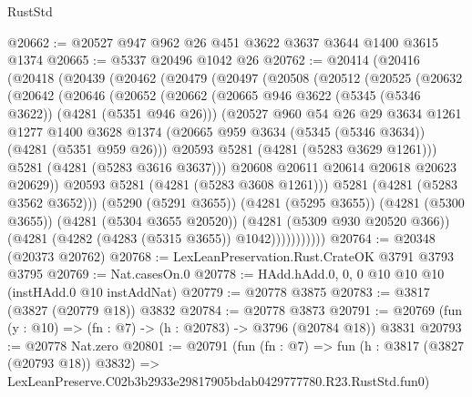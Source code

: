 \begin{lexlean}{RustStd}
\begin{coremodule}
@20662 := @20527 @947 @962 @26 @451 @3622 @3637 @3644 @1400 @3615 @1374
@20665 := @5337 @20496 @1042 @26
@20762 := @20414
    (@20416
      (@20418
        (@20439
          (@20462
            (@20479
              (@20497
                (@20508
                  (@20512
                    (@20525
                      (@20632
                        (@20642
                          (@20646
                            (@20652
                              (@20662
                                (@20665 @946 @3622 (@5345 (@5346 @3622)) (@4281 (@5351 @946 @26)))
                                (@20527
                                  @960
                                  @54
                                  @26
                                  @29
                                  @3634
                                  @1261
                                  @1277
                                  @1400
                                  @3628
                                  @1374
                                  (@20665 @959 @3634 (@5345 (@5346 @3634)) (@4281 (@5351 @959 @26)))
                                  @20593
                                  @5281
                                  (@4281 (@5283 @3629 @1261)))
                                @5281
                                (@4281 (@5283 @3616 @3637)))
                              @20608
                              @20611
                              @20614
                              @20618
                              @20623
                              @20629))
                          @20593
                          @5281
                          (@4281 (@5283 @3608 @1261)))
                        @5281
                        (@4281 (@5283 @3562 @3652)))
                      (@5290 (@5291 @3655))
                      (@4281 (@5295 @3655))
                      (@4281 (@5300 @3655))
                      (@4281 (@5304 @3655 @20520))
                      (@4281 (@5309 @930 @20520 @366))
                      (@4281 (@4282 (@4283 (@5315 @3655)) @1042)))))))))))
@20764 := @20348 (@20373 @20762)
@20768 := LexLeanPreservation.Rust.CrateOK @3791 @3793 @3795
@20769 := Nat.casesOn.{0}
@20778 := HAdd.hAdd.{0, 0, 0} @10 @10 @10 (instHAdd.{0} @10 instAddNat)
@20779 := @20778 @3875
@20783 := @3817 (@3827 (@20779 @18)) @3832
@20784 := @20778 @3873
@20791 := @20769 (fun (y : @10) => (fn : @7) -> (h : @20783) -> @3796 (@20784 @18)) @3831
@20793 := @20778 Nat.zero
@20801 := @20791
    (fun (fn : @7) =>
    fun (h : @3817 (@3827 (@20793 @18)) @3832) =>
    LexLeanPreserve.C02b3b2933e29817905bdab0429777780.R23.RustStd.fun0)

\end{coremodule}
\end{lexlean}
